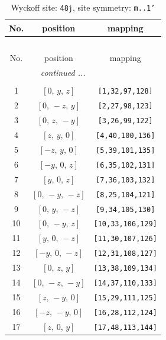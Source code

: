 \documentclass[fleqn,8pt]{jsarticle}
\begin{document}
\begin{longtable}{ccc}
\caption{Wyckoff site: {\tt 48j}, site symmetry: {\tt m..1'}}
 \\
 \hline \hline
No. & position & mapping \\ \hline \endfirsthead

\multicolumn{2}{l}{\tablename\ \thetable{}} \\
 \hline \hline
No. & position & mapping \\ \hline \endhead

 \hline \hline
\multicolumn{2}{r}{\footnotesize\it continued ...} \\ \endfoot

 \hline \hline
\multicolumn{2}{r}{} \\ \endlastfoot

1 & $\left[ 0,\, y,\, z \right]$ & {\tt [1,32,97,128]} \\ \hline
2 & $\left[ 0,\, - z,\, y \right]$ & {\tt [2,27,98,123]} \\ \hline
3 & $\left[ 0,\, z,\, - y \right]$ & {\tt [3,26,99,122]} \\ \hline
4 & $\left[ z,\, y,\, 0 \right]$ & {\tt [4,40,100,136]} \\ \hline
5 & $\left[ - z,\, y,\, 0 \right]$ & {\tt [5,39,101,135]} \\ \hline
6 & $\left[ - y,\, 0,\, z \right]$ & {\tt [6,35,102,131]} \\ \hline
7 & $\left[ y,\, 0,\, z \right]$ & {\tt [7,36,103,132]} \\ \hline
8 & $\left[ 0,\, - y,\, - z \right]$ & {\tt [8,25,104,121]} \\ \hline
9 & $\left[ 0,\, y,\, - z \right]$ & {\tt [9,34,105,130]} \\ \hline
10 & $\left[ 0,\, - y,\, z \right]$ & {\tt [10,33,106,129]} \\ \hline
11 & $\left[ y,\, 0,\, - z \right]$ & {\tt [11,30,107,126]} \\ \hline
12 & $\left[ - y,\, 0,\, - z \right]$ & {\tt [12,31,108,127]} \\ \hline
13 & $\left[ 0,\, z,\, y \right]$ & {\tt [13,38,109,134]} \\ \hline
14 & $\left[ 0,\, - z,\, - y \right]$ & {\tt [14,37,110,133]} \\ \hline
15 & $\left[ z,\, - y,\, 0 \right]$ & {\tt [15,29,111,125]} \\ \hline
16 & $\left[ - z,\, - y,\, 0 \right]$ & {\tt [16,28,112,124]} \\ \hline
17 & $\left[ z,\, 0,\, y \right]$ & {\tt [17,48,113,144]} \\ \hline

\end{longtable}
\end{document}
